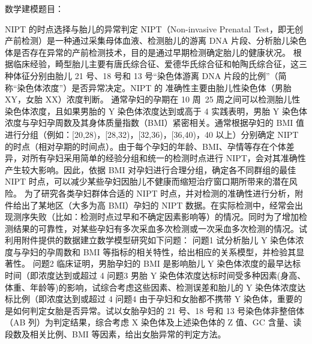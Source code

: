 数学建模题目：

NIPT 的时点选择与胎儿的异常判定 
NIPT（Non-invasive Prenatal Test，即无创产前检测）是一种通过采集母体血液、检测胎儿的游离 DNA 片段、分析胎儿染色体是否存在异常的产前检测技术，目的是通过早期检测确定胎儿的健康状况。 
根据临床经验，畸型胎儿主要有唐氏综合征、爱德华氏综合征和帕陶氏综合征，这三种体征分别由胎儿 21 号、18 号和 13 号“染色体游离 DNA 片段的比例”（简称“染色体浓度”）是否异常决定。NIPT 的 准确性主要由胎儿性染色体（男胎 XY，女胎 XX）浓度判断。
通常孕妇的孕期在 10 周~25 周之间可以检测胎儿性染色体浓度，且如果男胎的 Y 染色体浓度达到或高于 4%
实践表明，男胎 Y 染色体浓度与孕妇孕周数及其身体质量指数（BMI）紧密相关。通常根据孕妇的 BMI 值进行分组（例如：[20,28)，[28,32)，[32,36)，[36,40)，40 以上）分别确定 NIPT 的时点（相对孕期的时间点）。由于每个孕妇的年龄、BMI、孕情等存在个体差异，对所有孕妇采用简单的经验分组和统一的检测时点进行 NIPT，会对其准确性产生较大影响。因此，依据 BMI 对孕妇进行合理分组，确定各不同群组的最佳 NIPT 时点，可以减少某些孕妇因胎儿不健康而缩短治疗窗口期所带来的潜在风险。 
为了研究各类孕妇群体合适的 NIPT 时点，并对检测的准确性进行分析，附件给出了某地区（大多为高 BMI）孕妇的 NIPT 数据。在实际检测中，经常会出现测序失败（比如：检测时点过早和不确定因素影响等）的情况。同时为了增加检测结果的可靠性，对某些孕妇有多次采血多次检测或一次采血多次检测的情况。试利用附件提供的数据建立数学模型研究如下问题： 
问题1 试分析胎儿 Y 染色体浓度与孕妇的孕周数和 BMI 等指标的相关特性，给出相应的关系模型，并检验其显著性。 
问题2 临床证明，男胎孕妇的 BMI 是影响胎儿 Y 染色体浓度的最早达标时间（即浓度达到或超过 4%
问题3 男胎 Y 染色体浓度达标时间受多种因素(身高、体重、年龄等)的影响，试综合考虑这些因素、检测误差和胎儿的 Y 染色体浓度达标比例（即浓度达到或超过 4%
问题4 由于孕妇和女胎都不携带 Y 染色体，重要的是如何判定女胎是否异常。试以女胎孕妇的 21 号、18 号和 13 号染色体非整倍体（AB 列）为判定结果，综合考虑 X 染色体及上述染色体的 Z 值、GC 含量、读段数及相关比例、BMI 等因素，给出女胎异常的判定方法。

